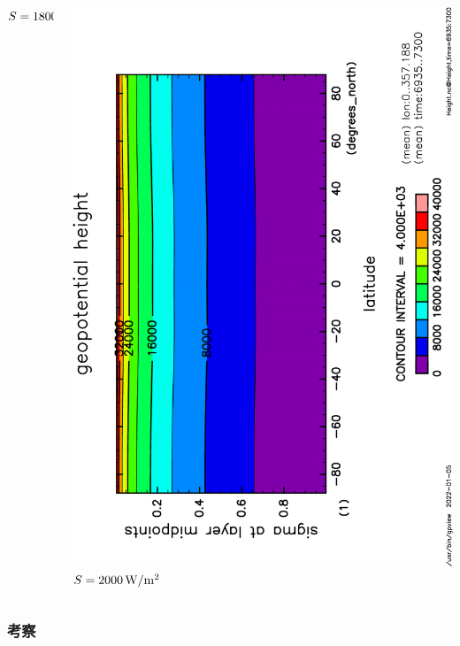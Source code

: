 \documentclass[aspectratio=149,9pt,fleqn]{beamer}
\begin{document}
\begin{frame}
\begin{columns}[T]
\begin{column}{.3\textwidth}
			\(S=1800\hmu{W/m^2}\)
		\end{column}
		\begin{column}{.3\textwidth}
			\centering
			\includegraphics[height=\textwidth,angle=-90]{S2000/Height,time=6935:7300-crop.pdf}
			\(S=2000\hmu{W/m^2}\)
		\end{column}
	\end{columns}
\end{frame}

\begin{frame}
	\frametitle{考察}
\end{frame}
\end{document}
